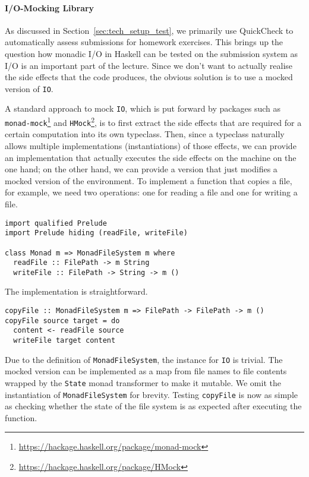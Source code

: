 \paragraph{I/O-Mocking Library}
As discussed in Section~\ref{sec:tech_setup_test}, we primarily use QuickCheck to automatically assess submissions for homework exercises.
This brings up the question how monadic I/O in Haskell can be tested on the submission system as I/O is an important part of the lecture.
Since we don't want to actually realise the side effects that the code produces, the obvious solution is to use a mocked version of \texttt{IO}.

A standard approach to mock \texttt{IO}, which is put forward by packages such as \texttt{monad-mock}\footnote{\url{https://hackage.haskell.org/package/monad-mock}} and \texttt{HMock}\footnote{\url{https://hackage.haskell.org/package/HMock}}, is to first extract the side effects that are required for a certain computation into its own typeclass.
Then, since a typeclass naturally allows multiple implementations (instantiations) of those effects, we can provide an implementation that actually executes the side effects on the machine on the one hand; on the other hand, we can provide a version that just modifies a mocked version of the environment.
To implement a function that copies a file, for example, we need two operations: one for reading a file and one for writing a file.
\begin{verbatim}
import qualified Prelude
import Prelude hiding (readFile, writeFile)

class Monad m => MonadFileSystem m where
  readFile :: FilePath -> m String
  writeFile :: FilePath -> String -> m ()
\end{verbatim}
The implementation is straightforward.
\begin{verbatim}
copyFile :: MonadFileSystem m => FilePath -> FilePath -> m ()
copyFile source target = do
  content <- readFile source
  writeFile target content
\end{verbatim}
Due to the definition of \texttt{MonadFileSystem}, the instance for \texttt{IO} is trivial.
The mocked version can be implemented as a map from file names to file contents wrapped by the \texttt{State} monad transformer to make it mutable.
We omit the instantiation of \texttt{MonadFileSystem} for brevity.
Testing \texttt{copyFile} is now as simple as checking whether the state of the file system is as expected after executing the function.
